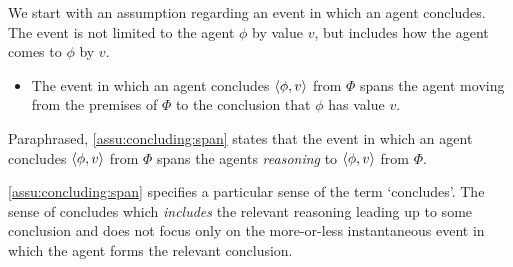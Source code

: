 \begin{note}
  We start with an assumption regarding an event in which an agent concludes.
  The event is not limited to the agent \evaling{} \(\phi\) by value \(v\), but includes how the agent comes to  \(\phi\) by \(v\).

  \begin{definition}
    \label{assu:concluding:span}

    \begin{itemize}
    \item
      The event in which an agent concludes \(\langle \phi, v \rangle\) from \(\Phi\) spans the agent moving from the premises of \(\Phi\) to the conclusion that \(\phi\) has value \(v\).
    \end{itemize}
    \vspace{-\baselineskip}
  \end{definition}

  Paraphrased, \autoref{assu:concluding:span} states that the event in which an agent concludes \(\langle \phi, v \rangle\) from \(\Phi\) spans the agents \emph{reasoning} to \(\langle \phi, v \rangle\) from \(\Phi\).
\end{note}

\begin{note}
  \autoref{assu:concluding:span} specifies a particular sense of the term `concludes'.
  The sense of concludes which \emph{includes} the relevant reasoning leading up to some conclusion and does not focus only on the more-or-less instantaneous event in which the agent forms the relevant conclusion.
\end{note}

